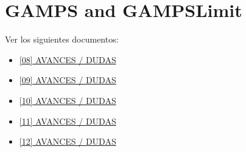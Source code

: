 
\clearpage

\section{GAMPS and GAMPSLimit}
\label{algo:gamps}
Ver los siguientes documentos:

\begin{itemize}
    \item \href{https://docs.google.com/document/d/1jc9UHNnnOrOysdIBEmg3IFO_6R_tU46ZBD4bVyxC1_E/edit}{[08] AVANCES / DUDAS}
    \item \href{https://docs.google.com/document/d/1Fj1wkzSjoqT897wc2f3ALNNFOJd_sgdo_1RWCzdEYJQ/edit}{[09] AVANCES / DUDAS}
    \item \href{https://docs.google.com/document/d/156XcV0VJywzLrJr5EpzyKzSkOhKWvZLiCk0EKJWAYwI/edit}{[10] AVANCES / DUDAS}
    \item \href{https://docs.google.com/document/d/1pBjNdfVZocH7eNy1bbVyFfFXEzExvnCaW0dg7uZFONU/edit}{[11] AVANCES / DUDAS}
    \item \href{https://docs.google.com/document/d/1y4VpBVxAfBu6fQ6LjYbetXGfj_0nIUCFMf4zotSn5IE/edit}{[12] AVANCES / DUDAS}
\end{itemize}
